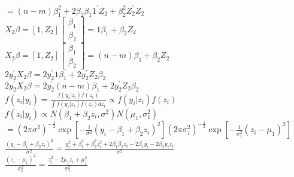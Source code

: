 \documentclass{article}\usepackage[]{graphicx}\usepackage[]{color}
\begin{document}
$=(n-m)\beta_{1}^{2}+2\beta_{2}\beta_{1}1^{\prime}Z_{2}+\beta_{2}^{2}Z_{2}^{\prime}Z_{2}$\\



$X_{2}\beta=\left[1,Z_{2}\right]\left[\begin{array}{c} \beta_{1} \\ \beta_{2} \end{array} \right]=1\beta_{1}+\beta_{2}Z_{2}$\\

$X_{2}\beta=\left[1,Z_{2}\right]\left[\begin{array}{c} \beta_{1} \\ \beta_{2} \end{array} \right]=(n-m)\beta_{1}+\beta_{2}Z_{2}$\\


$2y_{2}^{\prime}X_{2}\beta=2y_{2}^{\prime}1\beta_{1}+2y_{2}^{\prime}Z_{2}\beta_{2}$ \vspace{5mm}\\
$2y_{2}^{\prime}X_{2}\beta=2y_{2}^{\prime}(n-m)\beta_{1}+2y_{2}^{\prime}Z_{2}\beta_{2}$\vspace{5mm}\\


$f(z_{i}|y_{i})=\frac{f(y_{i}|z_{i})f(z_{i})}{\int f(y_{i}|z_{i})f(z_{i})dz_{i}}\propto f(y_{i}|z_{i})f(z_{i})$\vspace{5mm}\\


$f(z_{i}|y_{i}) \propto N(\beta_{1}+\beta_{2}z_{i},\sigma^{2})N(\mu_{1},\sigma^{2}_{1})$\vspace{5mm}\\

$=(2\pi\sigma^{2})^{-\frac{1}{2}}\exp[-\frac{1}{\sigma^{2}}(y_{i}-\beta_{1}+\beta_{2}z_{i})^{2}](2\pi\sigma^{2}_{1})^{-\frac{1}{2}}\exp[-\frac{1}{\sigma^{2}_{1}}(z_{i}-\mu_{1})^{2}]$\vspace{5mm}\\

$\frac{(y_{i}-\beta_{1}+\beta_{2} z_{i})^{2}}{\sigma^{2}}=\frac{y_{i}^{2}+\beta_{1}^{2}+\beta_{2}^{2} z_{i}^{2}+2\beta_{1} \beta_{2} z_{i}-2\beta_{1}y_{i}-2\beta_{2}y_{i} z_{i}}{\sigma^{2}}$\vspace{5mm}\\

$\frac{(z_{i}-\mu_{1})^{2}}{\sigma^{2}_{1}}=\frac{z_{i}^{2}-2\mu_{1}z_{i}+\mu_{1}^{2}}{\sigma^{2}_{1}}$\\
\end{document}
